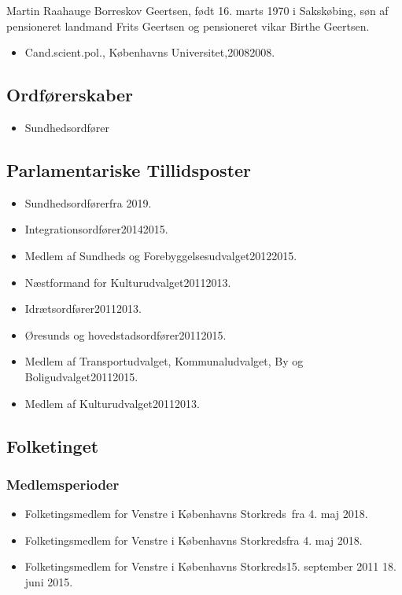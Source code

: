 \documentclass[11pt, a4paper]{awesome-cv}
\begin{document}
\makecvheader[R]
\makelettertitle
\begin{cvletter}
Martin Raahauge Borreskov Geertsen, født 16. marts 1970 i Sakskøbing, søn af pensioneret landmand Frits Geertsen og pensioneret vikar Birthe Geertsen.

\begin{itemize}
\item Cand.scient.pol., Københavns Universitet,20082008.
\end{itemize}
\subsection*{Ordførerskaber}
\begin{itemize}
\item Sundhedsordfører
\end{itemize}
\subsection*{Parlamentariske Tillidsposter}
\begin{itemize}
\item Sundhedsordførerfra 2019.
\item Integrationsordfører20142015.
\item Medlem af Sundheds og Forebyggelsesudvalget20122015.
\item Næstformand for Kulturudvalget20112013.
\item Idrætsordfører20112013.
\item Øresunds og hovedstadsordfører20112015.
\item Medlem af Transportudvalget, Kommunaludvalget, By og Boligudvalget20112015.
\item Medlem af Kulturudvalget20112013.
\end{itemize}
\subsection*{Folketinget}
\subsubsection*{Medlemsperioder}
\begin{itemize}
\item Folketingsmedlem for Venstre i Københavns Storkreds fra 4. maj 2018.
\item Folketingsmedlem for Venstre i Københavns Storkredsfra 4. maj 2018.
\item Folketingsmedlem for Venstre i Københavns Storkreds15. september 2011  18. juni 2015.
\end{itemize}

\end{cvletter}
\end{document}
